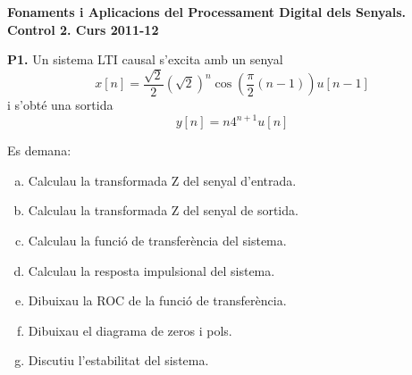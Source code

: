 \documentclass[12pt]{report}
\begin{document}
\begin{center}
\textbf{\Large Fonaments i Aplicacions del Processament Digital dels Senyals.\\ Control 2. Curs 2011-12}
\end{center}

\vskip 1cm
\noindent
\textbf{P1.} Un sistema LTI causal s'excita amb un senyal 
\[
x[n]=\frac{\sqrt{2}}{2} (\sqrt{2})^n \cos(\frac{\pi}{2}(n-1)) u[n-1]
\]
i s'obt\'e una sortida
\[
y[n]=n 4^{n+1} u[n]
\]

Es demana:
\begin{enumerate}[a)]
\item Calculau la transformada Z del senyal d'entrada.
\item Calculau la transformada Z del senyal de sortida.
\item Calculau la funci\'o de transfer\`encia del sistema.
\item Calculau la resposta impulsional del sistema.
\item Dibuixau la ROC de la funci\'o de transfer\`encia.
\item Dibuixau el diagrama de zeros i pols.
\item Discutiu l'estabilitat del sistema.
\end{enumerate}
\end{document}
